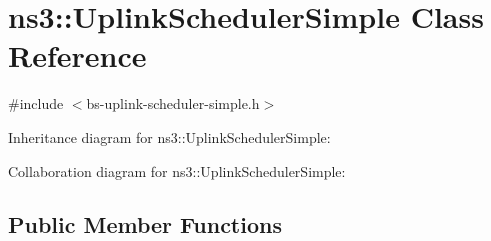 \hypertarget{classns3_1_1UplinkSchedulerSimple}{}\section{ns3\+:\+:Uplink\+Scheduler\+Simple Class Reference}
\label{classns3_1_1UplinkSchedulerSimple}


{\ttfamily \#include $<$bs-\/uplink-\/scheduler-\/simple.\+h$>$}



Inheritance diagram for ns3\+:\+:Uplink\+Scheduler\+Simple\+:


Collaboration diagram for ns3\+:\+:Uplink\+Scheduler\+Simple\+:
\subsection*{Public Member Functions}

